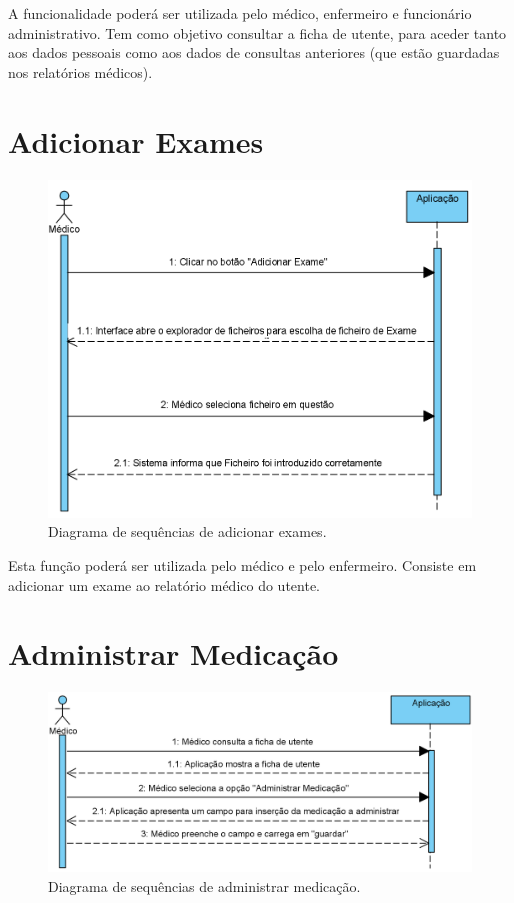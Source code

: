 \documentclass[11pt,a4paper,twoside]{report}
\begin{document}
A funcionalidade poderá ser utilizada pelo médico, enfermeiro e funcionário administrativo. 
Tem como objetivo consultar a ficha de utente, para aceder tanto aos dados pessoais como aos dados de consultas anteriores (que estão guardadas nos relatórios médicos). 

\section{Adicionar Exames}

\begin{figure}[H]
	\centering
	\includegraphics[width=0.7\linewidth]{image/SequencialDiagramsImages/AdicionarExame}
	\caption [Diagrama de sequências de adicionar exames.] {Diagrama de sequências de adicionar exames.}
	\label{fig:adicionarexameF}
\end{figure}

Esta função poderá ser utilizada pelo médico e pelo enfermeiro. Consiste em adicionar um exame ao relatório médico do utente. 


\section{Administrar Medicação }

\begin{figure}[H]
	\centering
	\includegraphics[width=0.7\linewidth]{image/SequencialDiagramsImages/AdministrarMedicação}
	\caption [Diagrama de sequências de administrar medicação.] {Diagrama de sequências de administrar medicação.}
	\label{fig:administrarmedicacaoF}
\end{figure}
\end{document}
